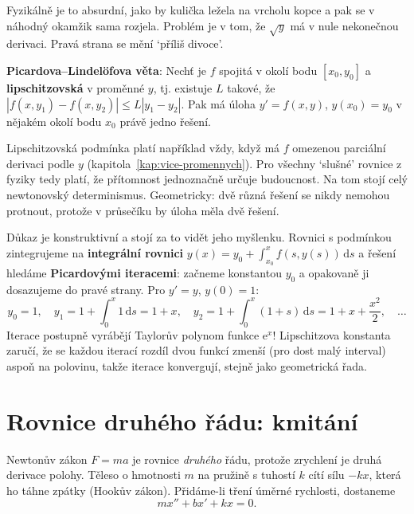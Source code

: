 Fyzikálně je to absurdní, jako by kulička ležela na vrcholu kopce a pak se v náhodný okamžik sama rozjela. Problém je v tom, že $\sqrt{y}$ má v nule nekonečnou derivaci. Pravá strana se mění `příliš divoce'.

\begin{definitionbox}
  \textbf{Picardova--Lindelöfova věta}: Nechť je $f$ spojitá v okolí bodu $[x_0, y_0]$ a \textbf{lipschitzovská} v proměnné $y$, tj. existuje $L$ takové, že $|f(x, y_1) - f(x, y_2)|\leq L|y_1 - y_2|$. Pak má úloha $y' = f(x, y)$, $y(x_0) = y_0$ v nějakém okolí bodu $x_0$ právě jedno řešení.
\end{definitionbox}

Lipschitzovská podmínka platí například vždy, když má $f$ omezenou parciální derivaci podle $y$ (kapitola~\ref{kap:vice-promennych}). Pro všechny `slušné' rovnice z fyziky tedy platí, že přítomnost jednoznačně určuje budoucnost. Na tom stojí celý newtonovský determinismus. Geometricky: dvě různá řešení se nikdy nemohou protnout, protože v průsečíku by úloha měla dvě řešení.

Důkaz je konstruktivní a stojí za to vidět jeho myšlenku. Rovnici s podmínkou zintegrujeme na \textbf{integrální rovnici} $y(x) = y_0 + \int_{x_0}^{x}f(s, y(s))\,\mathrm{d}s$ a řešení hledáme \textbf{Picardovými iteracemi}: začneme konstantou $y_0$ a opakovaně ji dosazujeme do pravé strany. Pro $y' = y$, $y(0) = 1$:
\begin{equation*}
  y_0 = 1,\quad y_1 = 1 + \int_0^x1\,\mathrm{d}s = 1 + x,\quad y_2 = 1 + \int_0^x(1 + s)\,\mathrm{d}s = 1 + x + \frac{x^2}{2},\quad\dots
\end{equation*}
Iterace postupně vyrábějí Taylorův polynom funkce $\mathrm{e}^x$! Lipschitzova konstanta zaručí, že se každou iterací rozdíl dvou funkcí zmenší (pro dost malý interval) aspoň na polovinu, takže iterace konvergují, stejně jako geometrická řada.

\section{Rovnice druhého řádu: kmitání}

Newtonův zákon $F = ma$ je rovnice \textit{druhého} řádu, protože zrychlení je druhá derivace polohy. Těleso o hmotnosti $m$ na pružině s tuhostí $k$ cítí sílu $-kx$, která ho táhne zpátky (Hookův zákon). Přidáme-li tření úměrné rychlosti, dostaneme
\begin{equation*}
  mx'' + bx' + kx = 0.
\end{equation*}

